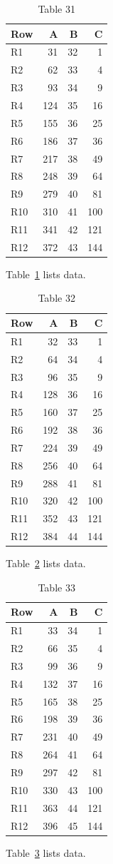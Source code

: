 \documentclass[10pt]{article}
\begin{document}
\begin{table}[ht]\centering\caption{Table 31}\label{tab:31}\begin{tabular}{lrrr}\toprule Row&A&B&C\\\midrule
R1&31&32&1\\
R2&62&33&4\\
R3&93&34&9\\
R4&124&35&16\\
R5&155&36&25\\
R6&186&37&36\\
R7&217&38&49\\
R8&248&39&64\\
R9&279&40&81\\
R10&310&41&100\\
R11&341&42&121\\
R12&372&43&144\\
\bottomrule\end{tabular}\end{table} Table~\ref{tab:31} lists data.
\begin{table}[ht]\centering\caption{Table 32}\label{tab:32}\begin{tabular}{lrrr}\toprule Row&A&B&C\\\midrule
R1&32&33&1\\
R2&64&34&4\\
R3&96&35&9\\
R4&128&36&16\\
R5&160&37&25\\
R6&192&38&36\\
R7&224&39&49\\
R8&256&40&64\\
R9&288&41&81\\
R10&320&42&100\\
R11&352&43&121\\
R12&384&44&144\\
\bottomrule\end{tabular}\end{table} Table~\ref{tab:32} lists data.
\begin{table}[ht]\centering\caption{Table 33}\label{tab:33}\begin{tabular}{lrrr}\toprule Row&A&B&C\\\midrule
R1&33&34&1\\
R2&66&35&4\\
R3&99&36&9\\
R4&132&37&16\\
R5&165&38&25\\
R6&198&39&36\\
R7&231&40&49\\
R8&264&41&64\\
R9&297&42&81\\
R10&330&43&100\\
R11&363&44&121\\
R12&396&45&144\\
\bottomrule\end{tabular}\end{table} Table~\ref{tab:33} lists data.
\end{document}

